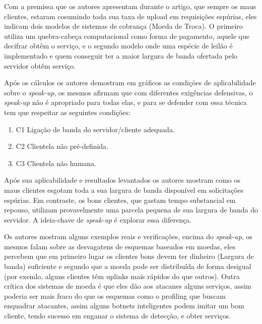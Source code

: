 \documentclass[a4paper,12pt]{article}
\begin{document}
\vspace{0.3cm}


Com a premissa que os autores apresentam durante o artigo, que sempre os maus clientes, estaram cosumindo toda sua taxa de upload em requisições espúrias, eles indicam dois modelos de sistemas de cobrança (Moeda de Troca). O primeiro utiliza um quebra-cabeça computacional como forma de pagamento, aquele que decifrar obtêm o serviço, e o segundo modelo onde uma espécie de leilão é implementado e quem conseguir ter a maior largura de banda ofertada pelo servidor obtêm serviço. 

\vspace{0.3cm}


Após os cálculos os autores demostram em gráficos as condições de aplicabilidade sobre o \textit{speak-up}, os mesmos afirmam que com diferentes exigências defensivas, o \textit{speak-up} não é apropriado para todas elas, e para se defender com essa técnica tem que respeitar as seguintes condições: 

\begin{enumerate}
	\item{C1} Ligação de banda do servidor/cliente adequada.

	\item{C2} Clientela não pré-definida.

	\item{C3} Clientela não humana.

\end{enumerate}
 
 \vspace{0.3cm}
 
 Após sua aplicabilidade e resultados levantados os autores mostram como os maus clientes esgotam toda a sua largura de banda disponível em solicitações espúrias. Em contraste, os bons clientes, que gastam tempo substancial em repouso, utilizam provavelmente uma parcela pequena de sua largura de banda do servidor. A ideia-chave de \textit{speak-up} é explorar essa diferença.
 \vspace{0.3cm}
 
 \vspace{0.3cm}
 
 Os autores mostram alguns exemplos reais e verificações, encima do \textit{speak-up}, os mesmos falam sobre as desvagatens de esquemas baseados em moedas, eles percebem que em primeiro lugar os clientes bons devem ter dinheiro (Largura de banda) suficiente e segundo que a moeda pode ser distribuída de forma desigual (por exemlo, alguns clientes têm uplinks mais rápidos do que outros). Outra crítica dos sistemas de moeda é que eles dão aos atacanes alguns serviços, assim poderia ser mais fraco do que os esquemas como o profiling que buscam enquadrar atacantes, assim alguns botnets inteligentes podem imitar um bom cliente, tendo sucesso em enganar o sistema de detecção, e obter serviços.
 
\end{document}

